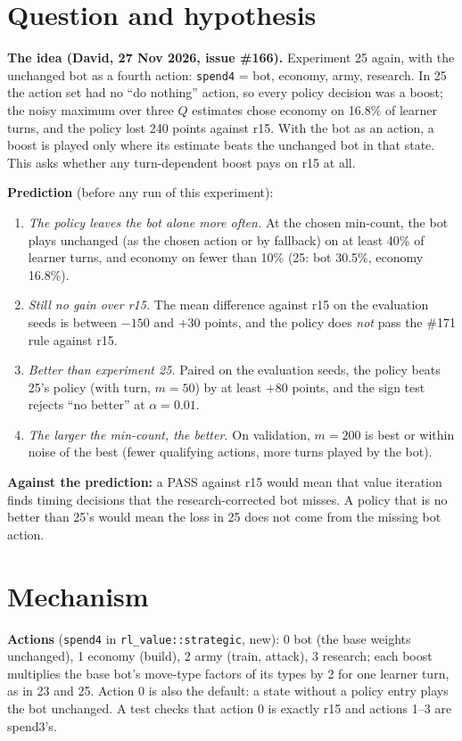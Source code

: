\documentclass{../polyexp}
\begin{document}

\ExpHeader

\section{Question and hypothesis}
\textbf{The idea (David, 27 Nov 2026, issue \#166).} Experiment 25 again, with the unchanged bot as a fourth action:
\texttt{spend4} = bot, economy, army, research. In 25 the action set had no ``do nothing'' action, so every policy
decision was a boost; the noisy maximum over three $Q$ estimates chose economy on 16.8\% of learner turns, and the
policy lost 240 points against r15. With the bot as an action, a boost is played only where its estimate beats the
unchanged bot in that state. This asks whether any turn-dependent boost pays on r15 at all.

\textbf{Prediction} (before any run of this experiment):
\begin{enumerate}
  \item \emph{The policy leaves the bot alone more often.} At the chosen min-count, the bot plays unchanged (as the
        chosen action or by fallback) on at least 40\% of learner turns, and economy on fewer than 10\%
        (25: bot 30.5\%, economy 16.8\%).
  \item \emph{Still no gain over r15.} The mean difference against r15 on the evaluation seeds is between $-150$ and
        $+30$ points, and the policy does \emph{not} pass the \#171 rule against r15.
  \item \emph{Better than experiment 25.} Paired on the evaluation seeds, the policy beats 25's policy (with turn,
        $m = 50$) by at least $+80$ points, and the sign test rejects ``no better'' at $\alpha = 0.01$.
  \item \emph{The larger the min-count, the better.} On validation, $m = 200$ is best or within noise of the best
        (fewer qualifying actions, more turns played by the bot).
\end{enumerate}
\textbf{Against the prediction:} a PASS against r15 would mean that value iteration finds timing decisions that the
research-corrected bot misses. A policy that is no better than 25's would mean the loss in 25 does not come from
the missing bot action.

\section{Mechanism}
\textbf{Actions} (\texttt{spend4} in \texttt{rl\_value::strategic}, new): 0 bot (the base weights unchanged),
1 economy (build), 2 army (train, attack), 3 research; each boost multiplies the base bot's move-type factors of its
types by 2 for one learner turn, as in 23 and 25. Action 0 is also the default: a state without a policy entry
plays the bot unchanged. A test checks that action 0 is exactly r15 and actions 1--3 are spend3's.
\end{document}
